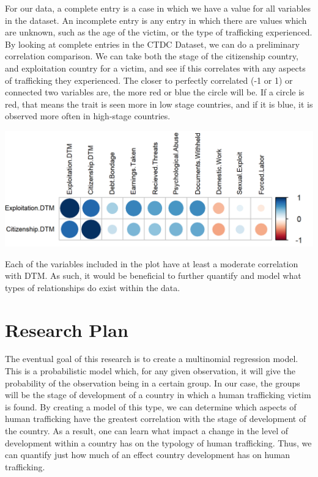 \documentclass{article} %
\begin{document}
For our data, a complete entry is a case in which we have a value for all variables in the dataset. An incomplete entry is any entry in which there are values which are unknown, such as the age of the victim, or the type of trafficking experienced. By looking at complete entries in the CTDC Dataset, we can do a preliminary correlation comparison. We can take both the stage of the citizenship country, and exploitation country for a victim, and see if this correlates with any aspects of trafficking they experienced. The closer to perfectly correlated (-1 or 1) or connected two variables are, the more red or blue the circle will be. If a circle is red, that means the trait is seen more in low stage countries, and if it is blue, it is observed more often in high-stage countries.

\hspace*{-1.5cm}
\includegraphics{Corrplot} \bigskip

Each of the variables included in the plot have at least a moderate correlation with DTM. As such, it would be beneficial to further quantify and model what types of relationships do exist within the data.


\section{Research Plan}

The eventual goal of this research is to create a multinomial regression model. This is a probabilistic model which, for any given observation, it will give the probability of the observation being in a certain group. In our case, the groups will be the stage of development of a country in which a human trafficking victim is found. By creating a model of this type, we can determine which aspects of human trafficking have the greatest correlation with the stage of development of the country. As a result, one can learn what impact a change in the level of development within a country has on the typology of human trafficking. Thus, we can quantify just how much of an effect country development has on human trafficking.
\end{document}
